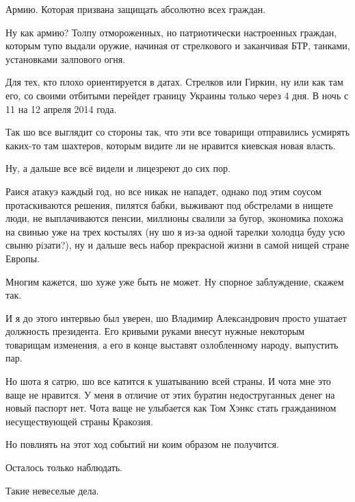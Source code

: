 Армию. Которая призвана защищать абсолютно всех граждан.

Ну как армию? Толпу отмороженных, но патриотически настроенных граждан, которым
тупо выдали оружие, начиная от стрелкового и заканчивая БТР, танками,
установками залпового огня.

Для тех, кто плохо ориентируется в датах. Стрелков или Гиркин, ну или как там
его, со своими отбитыми перейдет границу Украины только через 4 дня. В ночь с
11 на 12 апреля 2014 года.

Так шо все выглядит со стороны так, что эти все товарищи отправились усмирять
каких-то там шахтеров, которым видите ли не нравится киевская новая власть.

Ну, а дальше все всё видели и лицезреют до сих пор.

Раися атакуэ каждый год, но все никак не нападет, однако под этим соусом
протаскиваются решения, пилятся бабки, выживают под обстрелами в нищете люди,
не выплачиваются пенсии, миллионы свалили за бугор, экономика похожа на свинью
уже на трех костылях (ну шо я из-за одной тарелки холодца буду усю свыню
рiзати?), ну и дальше весь набор прекрасной жизни в самой нищей стране Европы.

Многим кажется, шо хуже уже быть не может. Ну спорное заблуждение, скажем так.

И я до этого интервью был уверен, шо Владимир Александрович просто ушатает
должность президента. Его кривыми руками внесут нужные некоторым товарищам
изменения, а его в конце выставят озлобленному народу, выпустить пар.

Но шота я сатрю, шо все катится к ушатыванию всей страны. И чота мне это ваще
не нравится. У меня в отличие от этих буратин недоструганных денег на новый
паспорт нет. Чота ваще не улыбается как Том Хэнкс стать гражданином
несуществующей страны Кракозия.

Но повлиять на этот ход событий ни коим образом не получится.

Осталось только наблюдать.

Такие невеселые дела. 
